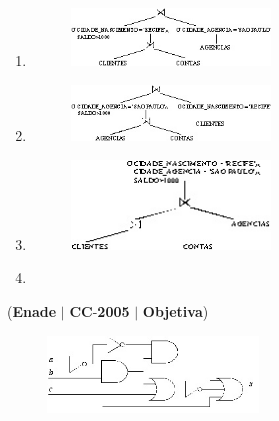 \documentclass{exam}
\begin{document}
\begin{questions}
\begin{enumerate}[label=\alph*)]
\begin{figure}[H]
\begin{center}
	\end{center}
\end{figure}
		\item 	
\begin{figure}[H]
	\begin{center}
		\includegraphics[width=0.5\textwidth]{CIENCIA_DA_COMPUTACAO_Prova2005-utf8_figuras/fig-0023.jpg}
	\end{center}
\end{figure}
		\item 	
\begin{figure}[H]
	\begin{center}
		\includegraphics[width=0.5\textwidth]{CIENCIA_DA_COMPUTACAO_Prova2005-utf8_figuras/fig-0024.jpg}
	\end{center}
\end{figure}
		\item 	
\begin{figure}[H]
	\begin{center}
		\includegraphics[width=0.5\textwidth]{CIENCIA_DA_COMPUTACAO_Prova2005-utf8_figuras/fig-0025.jpg}
	\end{center}
\end{figure}
		\item 	
	\end{enumerate}

\question (\textbf{Enade} $|$ \textbf{CC}-\textbf{2005} $|$ \textbf{Objetiva})


\begin{figure}[H]
	\begin{center}
		\includegraphics[width=0.5\textwidth]{CIENCIA_DA_COMPUTACAO_Prova2005-utf8_figuras/fig-0029.jpg}
	\end{center}
\end{figure}


\end{questions}
\end{document}
